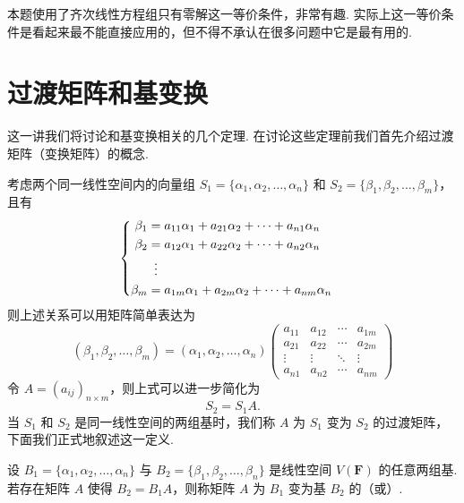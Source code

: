本题使用了齐次线性方程组只有零解这一等价条件，非常有趣. 实际上这一等价条件是看起来最不能直接应用的，但不得不承认在很多问题中它是最有用的.

\section{过渡矩阵和基变换}

这一讲我们将讨论和基变换相关的几个定理. 在讨论这些定理前我们首先介绍过渡矩阵（变换矩阵）的概念.

考虑两个同一线性空间内的向量组 $S_1 = \{\alpha_1,\alpha_2,\ldots,\alpha_n\}$ 和 $S_2 = \{\beta_1,\beta_2,\ldots,\beta_m\}$，且有
\[ \begin{cases} \begin{aligned}
                \beta_1 & = a_{11}\alpha_1+a_{21}\alpha_2+\cdots+a_{n1}\alpha_n \\
                \beta_2 & = a_{12}\alpha_1+a_{22}\alpha_2+\cdots+a_{n2}\alpha_n \\
                        & \vdotswithin{=}                                       \\
                \beta_m & = a_{1m}\alpha_1+a_{2m}\alpha_2+\cdots+a_{nm}\alpha_n
            \end{aligned} \end{cases} \]
则上述关系可以用矩阵简单表达为
\[(\beta_1,\beta_2,\ldots,\beta_m) = (\alpha_1,\alpha_2,\ldots,\alpha_n)\begin{pmatrix}
        a_{11} & a_{12} & \cdots & a_{1m} \\
        a_{21} & a_{22} & \cdots & a_{2m} \\
        \vdots & \vdots & \ddots & \vdots \\
        a_{n1} & a_{n2} & \cdots & a_{nm}
    \end{pmatrix}\]
令 $A = (a_{ij})_{n \times m}$，则上式可以进一步简化为
\[S_2 = S_1A.\]
当 $S_1$ 和 $S_2$ 是同一线性空间的两组基时，我们称 $A$ 为 $S_1$ 变为 $S_2$ 的过渡矩阵，下面我们正式地叙述这一定义.

\begin{definition}{}{}
    设 $B_1 = \{\alpha_1,\alpha_2,\ldots,\alpha_n\}$ 与 $B_2 = \{\beta_1,\beta_2,\ldots,\beta_n\}$ 是线性空间 $V(\mathbf{F})$ 的任意两组基. 若存在矩阵 $A$ 使得 $B_2 = B_1A$，则称矩阵 $A$ 为 $B_1$ 变为基 $B_2$ 的（或）.
\end{definition}

